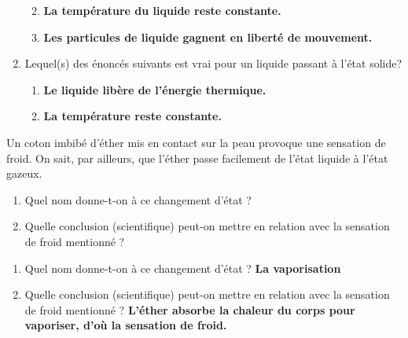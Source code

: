\documentclass[
  11pt,
  a4paper,
  openany]{book}
\providecommand{\tightlist}{%
  \setlength{\itemsep}{0pt}\setlength{\parskip}{0pt}}
\begin{document}
\begin{Answer}
\begin{enumerate}
  \begin{enumerate}
  \def\labelenumii{\alph{enumii}.}
  \tightlist
  \item
    \textbf{La température du liquide reste constante.}
  \item
    \textbf{Les particules de liquide gagnent en liberté de mouvement.}
  \end{enumerate}
\item
  Lequel(s) des énoncés suivants est vrai pour un liquide passant à l'état solide?

  \begin{enumerate}
  \def\labelenumii{\alph{enumii}.}
  \tightlist
  \item
    \textbf{Le liquide libère de l'énergie thermique.}
  \item
    \textbf{La température reste constante.}
  \end{enumerate}
\end{enumerate}

\end{Answer}

\begin{Exercise}

Un coton imbibé d'éther mis en contact sur la peau provoque une sensation de froid. On sait, par ailleurs, que l'éther passe facilement de l'état liquide à l'état gazeux.

\begin{enumerate}
\def\labelenumi{\arabic{enumi}.}
\item
  Quel nom donne-t-on à ce changement d'état ?
  ~
\item
  Quelle conclusion (scientifique) peut-on mettre en relation avec la sensation de froid mentionné ?
  ~
\end{enumerate}

\end{Exercise}

\begin{Answer}

\begin{enumerate}
\def\labelenumi{\arabic{enumi}.}
\tightlist
\item
  Quel nom donne-t-on à ce changement d'état ?
  \textbf{La vaporisation}
\item
  Quelle conclusion (scientifique) peut-on mettre en relation avec la sensation de froid mentionné ?
  \textbf{L'éther absorbe la chaleur du corps pour vaporiser, d'où la sensation de froid.}
\end{enumerate}

\end{Answer}
\end{document}
